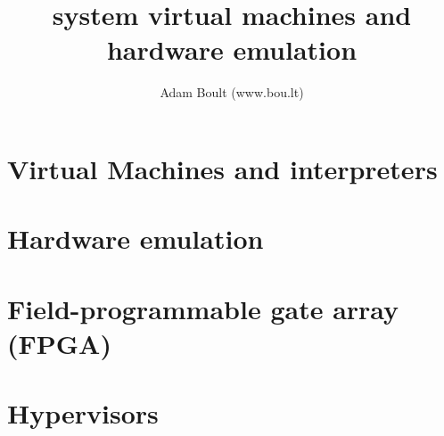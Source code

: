 \documentclass[oneside]{book}
\begin{document}
\author{Adam Boult (www.bou.lt)}
\title{system virtual machines and hardware emulation}
\maketitle

\setcounter{tocdepth}{0}
\tableofcontents



\part{Virtual Machines and interpreters}


\part{Hardware emulation}

\part{Field-programmable gate array (FPGA)}

\part{Hypervisors}
\end{document}
